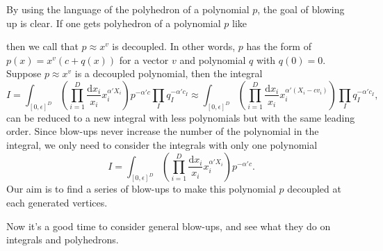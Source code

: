 \documentclass[12pt]{article}
\theoremstyle{definition}
\theoremstyle{plain}
\newcommand{\dif}{\mathrm{d}} %
\begin{document}
By using the language of the polyhedron of a polynomial $p$, the goal of blowing up is clear.
If one gets polyhedron of a polynomial $p$ like
\begin{center}
\end{center}
then we call that $p\approx x^v$ is decoupled. In other words, $p$ has the form of 
\(
p(x)=x^v(c+q(x))
\) for a vector $v$ and polynomial $q$ with $q(0)=0$. 
Suppose $p\approx x^v$ is a decoupled polynomial, then
the integral
\[
	I=\int_{[0,\epsilon]^D} \left(\prod_{i=1}^D\frac{\dif x_i}{x_i}x_i^{\alpha' X_i}\right)
	p^{-\alpha' c} \prod_I q_I^{-\alpha' c_I}
	\approx\int_{[0,\epsilon]^D} \left(\prod_{i=1}^D\frac{\dif x_i}{x_i}x_i^{\alpha' (X_i-cv_i)}\right)
	\prod_I q_I^{-\alpha' c_I},
\] 
can be reduced to a new integral with less polynomials but with the same leading order. 
Since blow-ups never increase the 
number of the polynomial in the integral, we only need to consider the integrals with only one 
polynomial
\[
	I=\int_{[0,\epsilon]^D} \left(\prod_{i=1}^D\frac{\dif x_i}{x_i}x_i^{\alpha' X_i}\right)
	p^{-\alpha' c}.
\] 
Our aim is to find a series of blow-ups to make this polynomial $p$ decoupled at
each generated vertices.

Now it's a good time to consider general blow-ups, and see what they do on integrals and polyhedrons.
\end{document}
